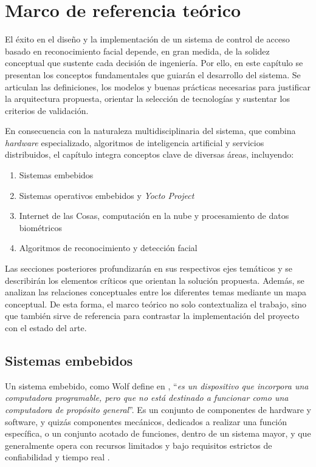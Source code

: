\chapter{Marco  de referencia teórico}
\label{ch:marco}

El éxito en el diseño y la implementación de un sistema de control de acceso basado en reconocimiento facial depende, en gran medida, de la solidez conceptual que sustente cada decisión de ingeniería. Por ello, en este capítulo se presentan los conceptos fundamentales que guiarán el desarrollo del sistema. Se articulan las definiciones, los modelos y buenas prácticas necesarias para justificar la arquitectura propuesta, orientar la selección de tecnologías y sustentar los criterios de validación.

En consecuencia con la naturaleza multidisciplinaria del sistema, que combina \textit{hardware} especializado, algoritmos de inteligencia artificial y servicios distribuidos, el capítulo integra conceptos clave de diversas áreas, incluyendo:

\begin{enumerate}
    \item Sistemas embebidos
    \item Sistemas operativos embebidos y \textit{Yocto Project}
    \item Internet de las Cosas, computación en la nube y procesamiento de datos biométricos
    \item Algoritmos de reconocimiento y detección facial
\end{enumerate}

Las secciones posteriores profundizarán en sus respectivos ejes temáticos y se describirán los elementos críticos que orientan la solución propuesta. Además, se analizan las relaciones conceptuales entre los diferentes temas mediante un mapa conceptual. De esta forma, el marco teórico no solo contextualiza el trabajo, sino que también sirve de referencia para contrastar la implementación del proyecto con el estado del arte.

\section{Sistemas embebidos}
Un sistema embebido, como Wolf define en \cite{wolf_embedded_2012}, ``\textit{es un dispositivo que incorpora una computadora programable, pero que no está destinado a funcionar como una computadora de propósito general}''. Es un conjunto de componentes de hardware y software, y quizás componentes mecánicos, dedicados a realizar una función específica, o un conjunto acotado de funciones, dentro de un sistema mayor, y que generalmente opera con recursos limitados y bajo requisitos estrictos de confiabilidad y tiempo real \cite{barr_embedded_1999}.

